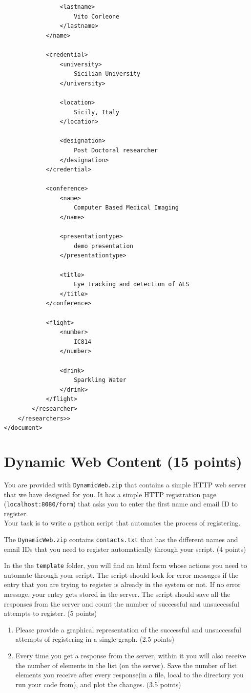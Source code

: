 \documentclass{WeSTassignment}
\begin{document}
\begin{lstlisting}
				<lastname>
					Vito Corleone
				</lastname>
			</name>

			<credential>
				<university>
					Sicilian University
				</university>

				<location>
					Sicily, Italy
				</location>

				<designation>
					Post Doctoral researcher
				</designation>
			</credential>

			<conference>
				<name>
					Computer Based Medical Imaging
				</name>

				<presentationtype>
					demo presentation
				</presentationtype>

				<title>
					Eye tracking and detection of ALS
				</title>
			</conference>

			<flight>
				<number>
					IC814
				</number>

				<drink>
					Sparkling Water
				</drink>
			</flight>
		</researcher>
	</researchers>>
</document>
\end{lstlisting}

\section{Dynamic Web Content (15 points)}

You are provided with \texttt{DynamicWeb.zip} that contains a simple HTTP web server that we have designed for you. It has a simple HTTP registration page (\texttt{localhost:8080/form}) that asks you to enter the first name and email ID to register.\\

Your task is to write a python script that automates the process of registering. 

The \texttt{DynamicWeb.zip} contains \texttt{contacts.txt} that has the different names and email IDs that you need to register automatically through your script. (4 points)

In the the \texttt{template} folder, you will find an html form whose actions you need to automate through your script. The script should look for error messages if the entry that you are trying to register is already in the system or not. If no error message, your entry gets stored in the server. The script should save all the responses from the server and count the number of successful and unsuccessful attempts to register. (5 points)

\begin{enumerate}
\item Please provide a graphical representation of the successful and unsuccessful attempts of registering in a single graph. (2.5 points)
\item Every time you get a response from the server, within it you will also receive the number of elements in the list (on the server). Save the number of list elements you receive after every response(in a file, local to the directory you run your code from), and plot the changes. (3.5 points)
\end{enumerate}
\end{document}
